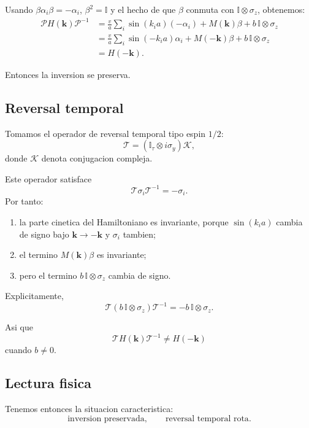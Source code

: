 Usando \(\beta\alpha_i\beta=-\alpha_i\), \(\beta^2=\mathbb{I}\) y el hecho de que \(\beta\) conmuta con \(\mathbb{I}\otimes \sigma_z\), obtenemos:
\begin{align}
\mathcal{P}H(\bm{k})\mathcal{P}^{-1}
&=
\frac{v}{a}\sum_i \sin(k_i a)(-\alpha_i)
+
M(\bm{k})\beta
+
b\,\mathbb{I}\otimes \sigma_z
\\
&=
\frac{v}{a}\sum_i \sin(-k_i a)\alpha_i
+
M(-\bm{k})\beta
+
b\,\mathbb{I}\otimes \sigma_z
\\
&=
H(-\bm{k}).
\end{align}

Entonces la inversion se preserva.

\subsection{Reversal temporal}
Tomamos el operador de reversal temporal tipo espin \(1/2\):
\begin{equation}
\mathcal{T}=
\left(\mathbb{I}_\tau\otimes i\sigma_y\right)\mathcal{K},
\label{c11:eq:T}
\end{equation}
donde \(\mathcal{K}\) denota conjugacion compleja.

Este operador satisface
\begin{equation}
\mathcal{T}\sigma_i \mathcal{T}^{-1} = -\sigma_i.
\end{equation}
Por tanto:
\begin{enumerate}[label=\arabic*.]
    \item la parte cinetica del Hamiltoniano es invariante, porque \(\sin(k_i a)\) cambia de signo bajo \(\bm{k}\to -\bm{k}\) y \(\sigma_i\) tambien;
    \item el termino \(M(\bm{k})\beta\) es invariante;
    \item pero el termino \(b\,\mathbb{I}\otimes \sigma_z\) cambia de signo.
\end{enumerate}

Explicitamente,
\begin{equation}
\mathcal{T}\left(b\,\mathbb{I}\otimes \sigma_z\right)\mathcal{T}^{-1}
=
-b\,\mathbb{I}\otimes \sigma_z.
\end{equation}

Asi que
\begin{equation}
\mathcal{T}H(\bm{k})\mathcal{T}^{-1}\neq H(-\bm{k})
\end{equation}
cuando \(b\neq 0\).

\subsection{Lectura fisica}
Tenemos entonces la situacion caracteristica:
\begin{equation}
\text{inversion preservada},
\qquad
\text{reversal temporal rota}.
\end{equation}

